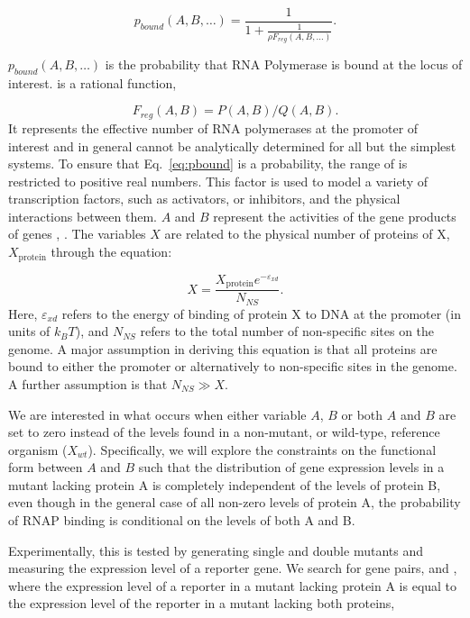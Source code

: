 \begin{equation}
  p_{bound}(A, B, \ldots) = \frac{1}{1 + \frac{1}{\rho F_{reg}(A, B, \ldots)}}.
  \label{eq:pbound}
\end{equation}

\(p_{bound}(A, B, \ldots)\) is the probability that RNA Polymerase is bound at
the locus of interest. \Freg{} is a rational function,

\begin{equation*}
    F_{reg}(A, B) = P(A, B)/Q(A, B).
\end{equation*}
It represents the effective number of RNA polymerases at the promoter of
interest and in general cannot be analytically determined for all but the
simplest systems. To ensure that Eq.~\ref{eq:pbound} is a probability, the range
of \Freg{} is restricted to positive real numbers. This factor is used to model
a variety of transcription factors, such as activators, or inhibitors, and the
physical interactions between them. \(A\) and \(B\) represent the activities of
the gene products of genes , . The variables \(X\) are related
to the physical number of proteins of X, \(X_{\text{protein}}\) through the
equation:

\begin{equation*}
    X = \frac{X_{\text{protein}}e^{-\varepsilon_{xd}}}{N_{NS}}.
\end{equation*}
Here, \(\varepsilon_{xd}\) refers to the energy of binding of protein X to
DNA at the promoter (in units of \(k_B T\)), and \(N_{NS}\) refers to the total
number of non-specific sites on the genome. A major assumption in deriving this
equation is that all proteins are bound to either the promoter or alternatively
to non-specific sites in the genome. A further assumption is that \(N_{NS} \gg
X\).

We are interested in what occurs when either variable \(A\), \(B\) or both
\(A\) and \(B\) are set to zero instead of the levels found in a non-mutant, or
wild-type, reference organism (\(X_{wt}\)). Specifically, we will explore the
constraints on the functional form between \(A\) and \(B\) such that the
distribution of gene expression levels in a mutant lacking protein A is
completely independent of the levels of protein B, even though in the general
case of all non-zero levels of protein A, the probability of RNAP binding is
conditional on the levels of both A and B.

Experimentally, this is tested by generating single and double mutants and
measuring the expression level of a reporter gene. We search for gene pairs,
 and , where the expression level of a reporter in a mutant
lacking protein A is equal to the expression level of the reporter in a mutant
lacking both proteins,

